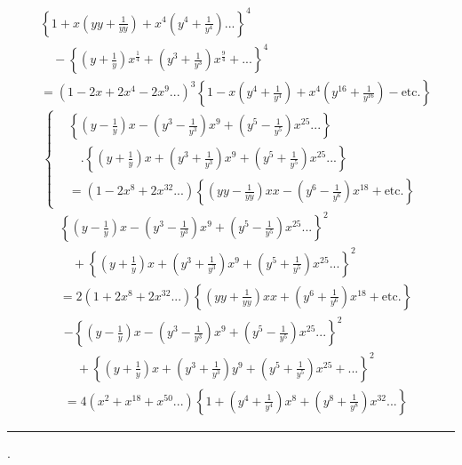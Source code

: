 \[\begin{aligned}
&\left\{1+x\left(yy+\frac1{yy}\right)+x^4\left(y^4+\frac1{y^4}\right){.}{.}{.}\right\}^4\\
&\quad-\left\{\left(y+\frac1y\right)x^{\frac14}+\left(y^3+\frac1{y^3}\right)x^{\frac94}+{.}{.}{.}\right\}^4\\
&=(1-2x+2x^4-2x^9{.}{.}{.})^3\left\{1-x\left(y^4+\frac1{y^4}\right)+x^4\left(y^{16}+\frac1{y^{16}}\right)-\text{etc.}\right\}
\end{aligned}\]
\begin{equation*}\tag*{\TransCrescent}
\left\{\begin{aligned}
&\left\{\left(y-\frac1y\right)x-\left(y^3-\frac1{y^3}\right)x^9+\left(y^5-\frac1{y^5}\right)x^{25}{.}{.}{.}\right\}\\
&\quad.\left\{\left(y+\frac1y\right)x+\left(y^3+\frac1{y^3}\right)x^9+\left(y^5+\frac1{y^5}\right)x^{25}{.}{.}{.}\right\}\\
&=(1-2x^8+2x^{32}{.}{.}{.})\left\{\left(yy-\frac1{yy}\right)xx-\left(y^6-\frac1{y^6}\right)x^{18}+\text{etc.}\right\}
\end{aligned}\right.
\end{equation*}
\[\begin{aligned}
&\left\{\left(y-\frac1y\right)x-\left(y^3-\frac1{y^3}\right)x^9+\left(y^5-\frac1{y^5}\right)x^{25}{.}{.}{.}\right\}^2\\
&\quad+\left\{\left(y+\frac1y\right)x+\left(y^3+\frac1{y^3}\right)x^9+\left(y^5+\frac1{y^5}\right)x^{25}{.}{.}{.}\right\}^2\\
&=2(1+2x^8+2x^{32}{.}{.}{.})\left\{\left(yy+\frac1{yy}\right)xx+\left(y^6+\frac1{y^6}\right)x^{18}+\text{etc.}\right\}
\end{aligned}\]
\[\begin{aligned}
&-\left\{\left(y-\frac1y\right)x-\left(y^3-\frac1{y^3}\right)x^9+\left(y^5-\frac1{y^5}\right)x^{25}{.}{.}{.}\right\}^2\\
&\quad+\left\{\left(y+\frac1y\right)x+\left(y^3+\frac1{y^3}\right)y^9+\left(y^5+\frac1{y^5}\right)x^{25}+{.}{.}{.}\right\}^2\\
&=4(x^2+x^{18}+x^{50}{.}{.}{.})\left\{1+\left(y^4+\frac1{y^4}\right)x^8+\left(y^8+\frac1{y^8}\right)x^{32}{.}{.}{.}\right\}
\end{aligned}\]
\par\smallskip\noindent\rule{.25\linewidth}{.4pt}\par
{\small\par{}.\par}
\clearpage
\endgroup
